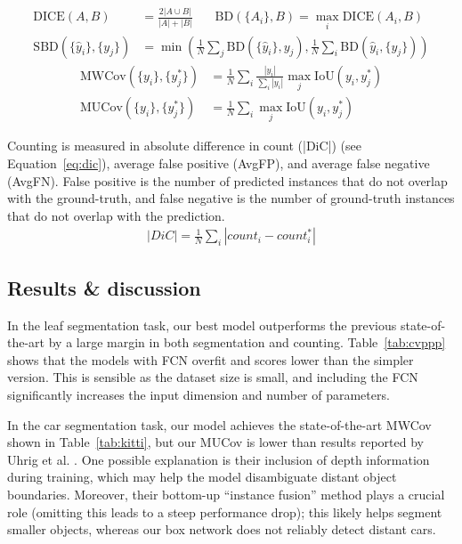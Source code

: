 \begin{align}
\label{eq:bd}
\text{DICE}(A, B) &= \frac{2 |A \cup B|}{|A| + |B|} \ \ \ \ \ \ \ \
\text{BD}(\{A_i\}, B) = \max_{i} \text{DICE}(A_i, B) \\
\label{eq:sbd}
\text{SBD}(\{\hat{y}_i\}, \{y_j\}) &= 
\min \left(\frac{1}{N} \sum_j \text{BD}(\{\hat{y}_i\}, y_j), \frac{1}{N}
\sum_i \text{BD}(\hat{y}_i, \{y_j\}) \right)
\end{align}
\vspace{-12pt}
\begin{align}
\label{eq:mwcov}
\text{MWCov}(\{y_i\}, \{y_j^*\}) &= \frac{1}{N} \sum_i 
\frac{|y_i|}{\sum_i |y_i|} \max_j
\text{IoU}(y_i, y_j^*)\\
\label{eq:mucov}
\text{MUCov}(\{y_i\}, \{y_j^*\}) &= \frac{1}{N} \sum_i 
\max_j \text{IoU}(y_i, y_j^*)
\end{align}

Counting is measured in absolute difference in count (|DiC|) (see
Equation~\ref{eq:dic}), average false positive (AvgFP), and average false
negative (AvgFN). False positive is the number of predicted instances that do
not overlap with the ground-truth, and false negative is the number of 
ground-truth instances that do not overlap with the prediction.
\vspace{-3pt}
\begin{align}
\label{eq:dic}
|DiC| = \frac{1}{N}\sum_i |count_i - count_i^*|
\end{align}
\vspace{-12pt}

\subsection{Results \& discussion}
\vspace{-3pt}
In the leaf segmentation task, our best model outperforms the previous 
state-of-the-art by a large margin in both segmentation and counting.
Table~\ref{tab:cvppp} shows that the models with FCN overfit and 
scores lower than the simpler version. This is sensible as the dataset size
is small, and including the FCN significantly increases the input dimension and
number of parameters.

In the car segmentation task, our model achieves the state-of-the-art MWCov
shown in Table~\ref{tab:kitti}, but our MUCov is lower than results reported by
Uhrig et al. \cite{uhrig16insseg}. One possible explanation is their inclusion
of depth information during training, which may help the model disambiguate
distant object boundaries. Moreover, their bottom-up ``instance fusion'' method
plays a crucial role (omitting this leads to a steep performance drop); this
likely helps segment smaller objects, whereas our box network does not reliably
detect distant cars.

